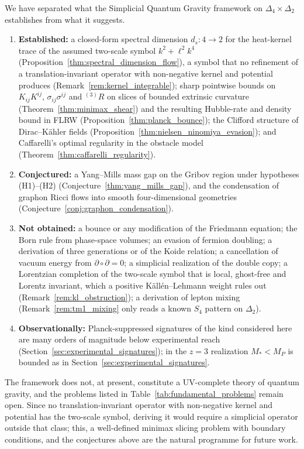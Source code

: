 \documentclass[11pt,a4paper,reqno]{amsart}
\theoremstyle{definition}
\numberwithin{equation}{section}
\begin{document}
We have separated what the Simplicial Quantum Gravity framework on $\Delta_4 \times \Delta_2$ establishes from what it suggests.
\begin{enumerate}
    \item \textbf{Established:} a closed-form spectral dimension $d_s: 4 \to 2$ for the heat-kernel trace of the assumed two-scale symbol $k^2 + \ell^2 k^4$ (Proposition~\ref{thm:spectral_dimension_flow}), a symbol that no refinement of a translation-invariant operator with non-negative kernel and potential produces (Remark~\ref{rem:kernel_integrable}); sharp pointwise bounds on $K_{ij}K^{ij}$, $\sigma_{ij}\sigma^{ij}$ and ${}^{(3)}R$ on slices of bounded extrinsic curvature (Theorem~\ref{thm:minimax_shear}) and the resulting Hubble-rate and density bound in FLRW (Proposition~\ref{thm:planck_bounce}); the Clifford structure of Dirac--K\"ahler fields (Proposition~\ref{thm:nielsen_ninomiya_evasion}); and Caffarelli's optimal regularity in the obstacle model (Theorem~\ref{thm:caffarelli_regularity}).
    \item \textbf{Conjectured:} a Yang--Mills mass gap on the Gribov region under hypotheses (H1)--(H2) (Conjecture~\ref{thm:yang_mills_gap}), and the condensation of graphon Ricci flows into smooth four-dimensional geometries (Conjecture~\ref{conj:graphon_condensation}).
    \item \textbf{Not obtained:} a bounce or any modification of the Friedmann equation; the Born rule from phase-space volumes; an evasion of fermion doubling; a derivation of three generations or of the Koide relation; a cancellation of vacuum energy from $\partial \circ \partial = 0$; a simplicial realization of the double copy; a Lorentzian completion of the two-scale symbol that is local, ghost-free and Lorentz invariant, which a positive K\"all\'en--Lehmann weight rules out (Remark~\ref{rem:kl_obstruction}); a derivation of lepton mixing (Remark~\ref{rem:tm1_mixing} only reads a known $S_4$ pattern on $\Delta_2$).
    \item \textbf{Observationally:} Planck-suppressed signatures of the kind considered here are many orders of magnitude below experimental reach (Section~\ref{sec:experimental_signatures}); in the $z = 3$ realization $M_\ast < M_P$ is bounded as in Section~\ref{sec:experimental_signatures}.
\end{enumerate}
The framework does not, at present, constitute a UV-complete theory of quantum gravity, and the problems listed in Table~\ref{tab:fundamental_problems} remain open. Since no translation-invariant operator with non-negative kernel and potential has the two-scale symbol, deriving it would require a simplicial operator outside that class; this, a well-defined minimax slicing problem with boundary conditions, and the conjectures above are the natural programme for future work.
\end{document}
